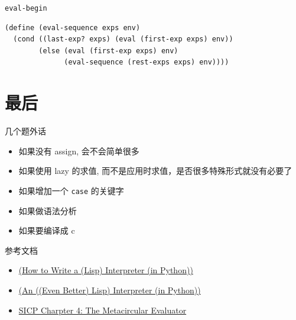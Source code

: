 \documentclass[presentation, bigger]{beamer}
\begin{document}
\begin{frame}[fragile,label={sec:org3c9ad0a}]{\texttt{eval-begin}}
\begin{lstlisting}
(define (eval-sequence exps env)
  (cond ((last-exp? exps) (eval (first-exp exps) env))
        (else (eval (first-exp exps) env)
              (eval-sequence (rest-exps exps) env))))
\end{lstlisting}
\end{frame}

\section{最后}
\label{sec:orgbe5e397}
\begin{frame}[fragile,label={sec:orga1eecfe}]{几个题外话}
 \begin{itemize}
\item 如果没有 assign, 会不会简单很多
\item 如果使用 lazy 的求值, 而不是应用时求值，是否很多特殊形式就没有必要了
\item 如果增加一个 \texttt{case} 的关键字
\item 如果做语法分析
\item 如果要编译成 c
\end{itemize}
\end{frame}

\begin{frame}[label={sec:orgcb5f36b}]{参考文档}
\begin{itemize}
\item \href{http://norvig.com/lispy.html}{(How to Write a (Lisp) Interpreter (in Python))}
\item \href{http://norvig.com/lispy2.html}{(An ((Even Better) Lisp) Interpreter (in Python))}
\item \href{https://mitpress.mit.edu/sicp/full-text/book/book-Z-H-26.html\#\%\_sec\_4.1}{SICP Charpter 4: The Metacircular Evaluator}
\end{itemize}
\end{frame}
\end{document}
